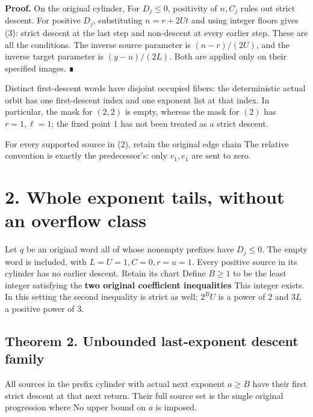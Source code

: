\textbf{Proof.} On the original cylinder,
 For \(D_j\le0\), positivity of
\(n,C_j\) rules out strict descent. For positive \(D_j\), substituting
\(n=r+2Ut\) and using integer floors gives (3): strict descent at the
last step and non-descent at every earlier step. These are all the
conditions. The inverse source parameter is \((n-r)/(2U)\), and the
inverse target parameter is \((y-u)/(2L)\). Both are applied only on
their specified images. ∎

Distinct first-descent words have disjoint occupied fibers: the
deterministic actual orbit has one first-descent index and one exponent
list at that index. In particular, the mask for \((2,2)\) is empty,
whereas the mask for \((2)\) has \(r=1,\ell=1\); the fixed point 1 has
not been treated as a strict descent.

For every supported source in (2), retain the original edge chain
 The relative convention is exactly
the predecessor's: only \(v_1,e_1\) are sent to zero.

\section{2. Whole exponent tails, without an overflow class}

Let \(q\) be an original word all of whose nonempty prefixes have
\(D_j\le0\). The empty word is included, with \(L=U=1,C=0,r=u=1\). Every
positive source in its cylinder has no earlier descent. Retain its chart
 Define
\(B\ge1\) to be the least integer satisfying the \textbf{two original
coefficient inequalities} 
This integer exists. In this setting the second inequality is strict as
well: \(2^BU\) is a power of 2 and \(3L\) a positive power of 3.

\subsection{Theorem 2. Unbounded last-exponent descent family}

All sources in the prefix cylinder with actual next exponent \(a\ge B\)
have their first strict descent at that next return. Their full source
set is the single original progression
 where
 No upper bound on \(a\) is
imposed.

